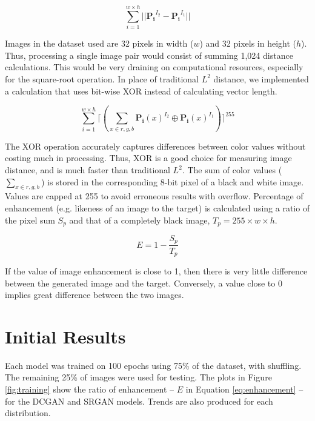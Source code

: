 \documentclass[letterpaper]{article} %
\begin{document}
\begin{equation}
\label{eq:distance}
\sum_{i=1}^{w \times h}||\mathbf{P_i}^{I_2} - \mathbf{P_i}^{I_1}||
\end{equation}

Images in the dataset used are 32 pixels in width ($w$) and 32 pixels in height ($h$).
Thus, processing a single image pair would consist of summing 1,024
distance calculations.
This would be very draining on computational resources,
especially for the square-root operation.
In place of traditional $L^2$ distance, we implemented a calculation
that uses bit-wise XOR instead of calculating vector length.

\begin{equation}
\label{eq:xor}
\sum_{i=1}^{w \times h}\lceil(\sum_{x \in r,g,b}\mathbf{P_i}(x)^{I_2} \oplus \mathbf{P_i}(x)^{I_1})\rceil^{255}
\end{equation}

The XOR operation accurately captures differences between color values without costing much in processing.
Thus, XOR is a good choice for measuring image distance, and is much faster than
traditional $L^2$.
The sum of color values ($\sum_{x \in r,g,b}$) is stored in
the corresponding 8-bit pixel of a black and white image.
Values are capped at 255 to avoid erroneous results with overflow.
Percentage of enhancement (e.g. likeness of an image to the target)
is calculated using a ratio of the pixel sum $S_p$
and that of a completely black image, $T_p = 255 \times w \times h$.

\begin{equation}
\label{eq:enhancement}
E = 1 - \frac{S_p}{T_p}
\end{equation}

If the value of image enhancement
is close to 1, then there is very little difference between the generated
image and the target.
Conversely, a value close to 0 implies great difference between the two images.


\section{Initial Results}
Each model was trained on 100 epochs using 75\% of the dataset, with shuffling.
The remaining 25\% of images were used for testing.
The plots in Figure \ref{fig:training} show the ratio of
enhancement -- $E$ in Equation \ref{eq:enhancement} -- for the DCGAN and SRGAN models.
Trends are also produced for each distribution.
\end{document}
